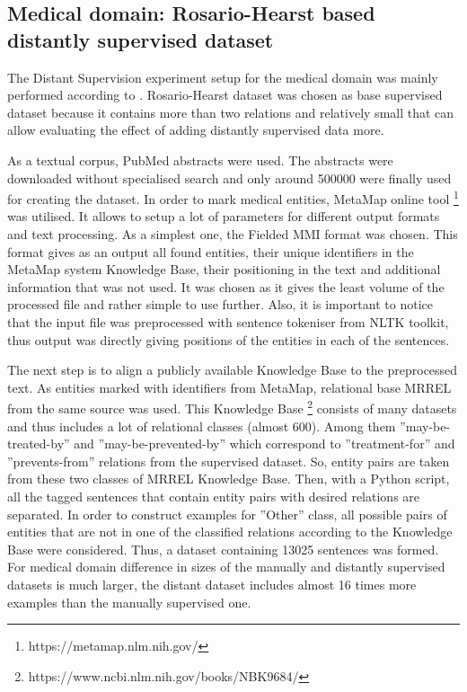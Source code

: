 \subsection{Medical domain: Rosario-Hearst based distantly supervised dataset}
The Distant Supervision experiment setup for the medical domain was mainly performed according to 
\cite{roller2014applying}. Rosario-Hearst dataset was chosen as base supervised dataset 
because it contains more than two relations and relatively small that can allow evaluating the 
effect of adding distantly supervised data more. 

As a textual corpus, PubMed abstracts were used. The abstracts were downloaded without 
specialised search and only around 500000 were finally used for creating the dataset. 
In order to mark medical entities, MetaMap online tool 
\footnote{https://metamap.nlm.nih.gov/} was utilised. It allows to setup a lot of parameters for different 
output formats and text processing. As a simplest one, the Fielded MMI format was chosen. This 
format gives as an output all found entities, their unique identifiers in the MetaMap system Knowledge Base, 
their positioning in the text and additional information that was not used. It was chosen as it gives the least 
volume of the processed file and rather simple to use further. Also, it is important to notice that the input file was 
preprocessed with sentence tokeniser from NLTK toolkit, thus output was directly giving 
positions of the entities in each of the sentences.

The next step is to align a publicly available Knowledge Base to the preprocessed text. 
As entities marked with identifiers from MetaMap, relational base MRREL from the same source was used. This Knowledge Base 
\footnote{https://www.ncbi.nlm.nih.gov/books/NBK9684/} consists of many datasets 
and thus includes a lot of relational classes (almost 600). Among them ''may-be-treated-by'' and 
''may-be-prevented-by'' which correspond to ''treatment-for'' and ''prevents-from'' relations from 
the supervised dataset. So, entity pairs are taken from these two classes of MRREL Knowledge Base.
Then, with a Python script, all the tagged sentences that contain entity pairs with desired 
relations are separated. In order to construct examples for ''Other'' class, all possible pairs of entities
that are not in one of the classified relations according to the Knowledge Base were considered. Thus, a dataset containing 13025 
sentences was formed. For medical domain difference in sizes of the manually and distantly supervised
datasets is much larger, the distant dataset includes almost 16 times more examples than the manually
supervised one.

